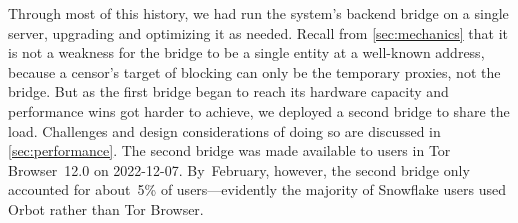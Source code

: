\documentclass[letterpaper,twocolumn]{article}
\begin{document}
Through most of this history,
we had run the system's backend bridge on a single server,
upgrading and optimizing it as needed.
Recall from \autoref{sec:mechanics} that it is not a weakness
for the bridge to be a single entity at a well-known address,
because a censor's target of blocking can only be the temporary proxies, not the bridge.
But as the first bridge began to reach its hardware capacity
and performance wins got harder to achieve,
we deployed a second bridge to share the load.
Challenges and design considerations of doing so are discussed in \autoref{sec:performance}.
The second bridge was made available to users in
Tor Browser~12.0 on \mbox{2022-12-07}.
By~February, however, the second bridge only accounted for about~5\%
of users---evidently the majority of Snowflake users used Orbot
rather than Tor Browser.
\end{document}
